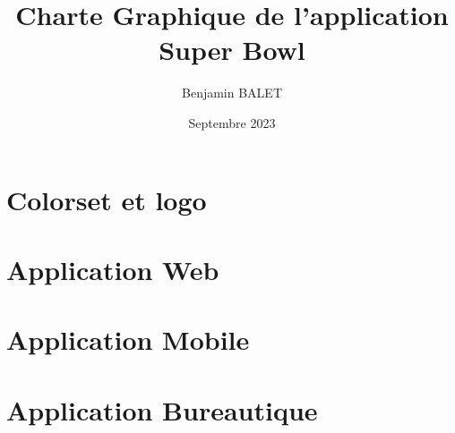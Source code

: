 \documentclass{book}
\title{Charte Graphique de l'application Super Bowl}
\author{Benjamin BALET}
\date{Septembre 2023}
\begin{document}
\maketitle{}
\tableofcontents
\newpage

\chapter{Colorset et logo}


\chapter{Application Web}


\chapter{Application Mobile}


\chapter{Application Bureautique}


\begin{appendix}
    \listoffigures
    \listoftables
  \end{appendix}
\end{document}

